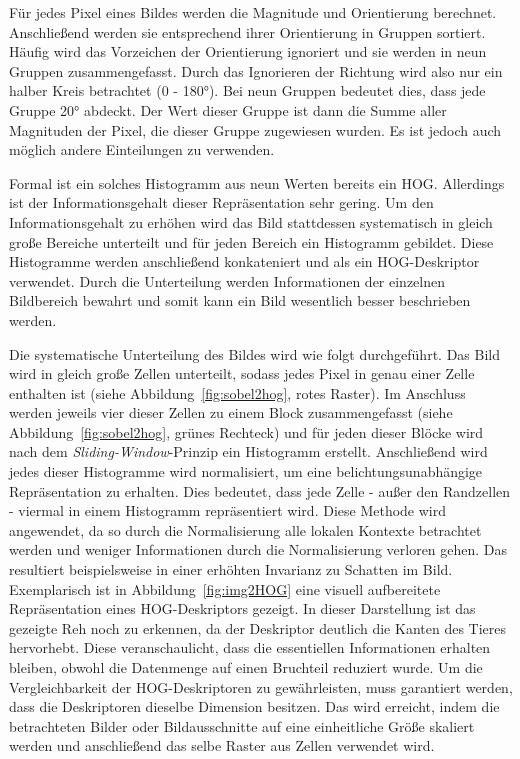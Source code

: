 Für jedes Pixel eines Bildes werden die Magnitude und Orientierung berechnet. Anschließend werden sie entsprechend ihrer Orientierung in Gruppen sortiert. Häufig wird das Vorzeichen der Orientierung ignoriert und sie werden in neun Gruppen zusammengefasst. Durch das Ignorieren der Richtung wird also nur ein halber Kreis betrachtet (0 - 180°). Bei neun Gruppen bedeutet dies, dass jede Gruppe 20° abdeckt. Der Wert dieser Gruppe ist dann die Summe aller Magnituden der Pixel, die dieser Gruppe zugewiesen wurden. Es ist jedoch auch möglich andere Einteilungen zu verwenden.

Formal ist ein solches Histogramm aus neun Werten bereits ein HOG. Allerdings ist der Informationsgehalt dieser Repräsentation sehr gering. Um den Informationsgehalt zu erhöhen wird das Bild stattdessen systematisch in gleich große Bereiche unterteilt und für jeden Bereich ein Histogramm gebildet. Diese Histogramme werden anschließend konkateniert und als ein HOG-Deskriptor verwendet. Durch die Unterteilung werden Informationen der einzelnen Bildbereich bewahrt und somit kann ein Bild wesentlich besser beschrieben werden. 

Die systematische Unterteilung des Bildes wird wie folgt durchgeführt. Das Bild wird in gleich große Zellen unterteilt, sodass jedes Pixel in genau einer Zelle enthalten ist (siehe Abbildung~\ref{fig:sobel2hog}, rotes Raster). Im Anschluss werden jeweils vier dieser Zellen zu einem Block zusammengefasst (siehe Abbildung~\ref{fig:sobel2hog}, grünes Rechteck) und für jeden dieser Blöcke wird nach dem \textit{Sliding-Window}-Prinzip ein Histogramm erstellt. Anschließend wird jedes dieser Histogramme wird normalisiert, um eine belichtungsunabhängige Repräsentation zu erhalten. Dies bedeutet, dass jede Zelle - außer den Randzellen - viermal in einem Histogramm repräsentiert wird. Diese Methode wird angewendet, da so durch die Normalisierung alle lokalen Kontexte betrachtet werden und weniger Informationen durch die Normalisierung verloren gehen. Das resultiert beispielsweise in einer erhöhten Invarianz zu Schatten im Bild. \\
Exemplarisch ist in Abbildung~\ref{fig:img2HOG} eine visuell aufbereitete Repräsentation eines HOG-Deskriptors gezeigt. In dieser Darstellung ist das gezeigte Reh noch zu erkennen, da der Deskriptor deutlich die Kanten des Tieres hervorhebt. Diese veranschaulicht, dass die essentiellen Informationen erhalten bleiben, obwohl die Datenmenge auf einen Bruchteil reduziert wurde. Um die Vergleichbarkeit der HOG-Deskriptoren zu gewährleisten, muss garantiert werden, dass die Deskriptoren dieselbe Dimension besitzen. Das wird erreicht, indem die betrachteten Bilder oder Bildausschnitte auf eine einheitliche Größe skaliert werden und anschließend das selbe Raster aus Zellen verwendet wird.  \cite{dalal05}\cite{HOG1}

